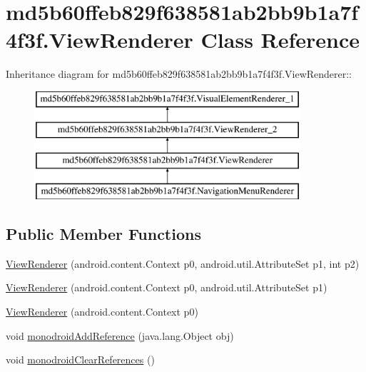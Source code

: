 \hypertarget{classmd5b60ffeb829f638581ab2bb9b1a7f4f3f_1_1_view_renderer}{
\section{md5b60ffeb829f638581ab2bb9b1a7f4f3f.ViewRenderer Class Reference}
\label{classmd5b60ffeb829f638581ab2bb9b1a7f4f3f_1_1_view_renderer}
}
Inheritance diagram for md5b60ffeb829f638581ab2bb9b1a7f4f3f.ViewRenderer::\begin{figure}[H]
\begin{center}
\leavevmode
\includegraphics[height=4cm]{classmd5b60ffeb829f638581ab2bb9b1a7f4f3f_1_1_view_renderer}
\end{center}
\end{figure}
\subsection*{Public Member Functions}
\begin{CompactItemize}
\item 
\hyperlink{classmd5b60ffeb829f638581ab2bb9b1a7f4f3f_1_1_view_renderer_7824854b6d56615c217020e835a18df7}{ViewRenderer} (android.content.Context p0, android.util.AttributeSet p1, int p2)
\item 
\hyperlink{classmd5b60ffeb829f638581ab2bb9b1a7f4f3f_1_1_view_renderer_db13c4a3014dd0c910b8ccf98f0c66c8}{ViewRenderer} (android.content.Context p0, android.util.AttributeSet p1)
\item 
\hyperlink{classmd5b60ffeb829f638581ab2bb9b1a7f4f3f_1_1_view_renderer_6c38e734de3e5855f03713824966678f}{ViewRenderer} (android.content.Context p0)
\item 
void \hyperlink{classmd5b60ffeb829f638581ab2bb9b1a7f4f3f_1_1_view_renderer_9ce576208d6e67c5201f21b67a8baf34}{monodroidAddReference} (java.lang.Object obj)
\item 
void \hyperlink{classmd5b60ffeb829f638581ab2bb9b1a7f4f3f_1_1_view_renderer_a03a52443eaab5b1890013945129a8e2}{monodroidClearReferences} ()
\end{CompactItemize}
